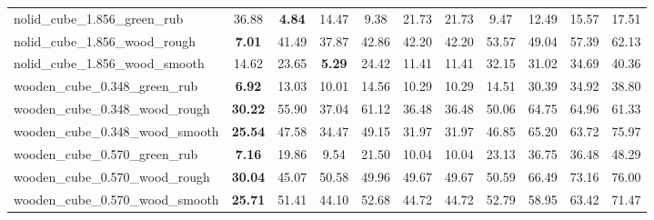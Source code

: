\begin{table}[H]
{\begin{tabular}{l cccccccccc}
        nolid\_cube\_1.856\_green\_rub & 36.88 & \textbf{4.84} & 14.47 & 9.38 & 21.73 & 21.73 & 9.47 & 12.49 & 15.57 & 17.51 \\
        nolid\_cube\_1.856\_wood\_rough & \textbf{7.01} & 41.49 & 37.87 & 42.86 & 42.20 & 42.20 & 53.57 & 49.04 & 57.39 & 62.13 \\
        nolid\_cube\_1.856\_wood\_smooth & 14.62 & 23.65 & \textbf{5.29} & 24.42 & 11.41 & 11.41 & 32.15 & 31.02 & 34.69 & 40.36 \\
        wooden\_cube\_0.348\_green\_rub & \textbf{6.92} & 13.03 & 10.01 & 14.56 & 10.29 & 10.29 & 14.51 & 30.39 & 34.92 & 38.80 \\
        wooden\_cube\_0.348\_wood\_rough & \textbf{30.22} & 55.90 & 37.04 & 61.12 & 36.48 & 36.48 & 50.06 & 64.75 & 64.96 & 61.33 \\
        wooden\_cube\_0.348\_wood\_smooth & \textbf{25.54} & 47.58 & 34.47 & 49.15 & 31.97 & 31.97 & 46.85 & 65.20 & 63.72 & 75.97 \\
        wooden\_cube\_0.570\_green\_rub & \textbf{7.16} & 19.86 & 9.54 & 21.50 & 10.04 & 10.04 & 23.13 & 36.75 & 36.48 & 48.29 \\
        wooden\_cube\_0.570\_wood\_rough & \textbf{30.04} & 45.07 & 50.58 & 49.96 & 49.67 & 49.67 & 50.59 & 66.49 & 73.16 & 76.00 \\
        wooden\_cube\_0.570\_wood\_smooth & \textbf{25.71} & 51.41 & 44.10 & 52.68 & 44.72 & 44.72 & 52.79 & 58.95 & 63.42 & 71.47 \\
        \bottomrule
    \end{tabular}
    }
\end{table}



\vspace{1cm}

\clearpage

